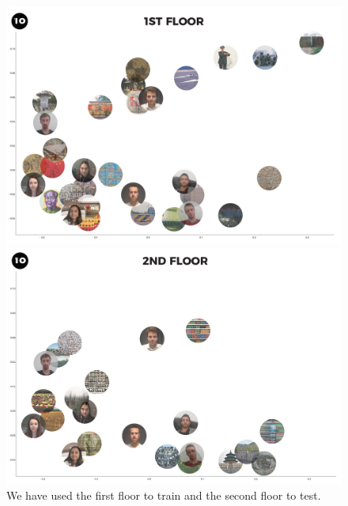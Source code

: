 \documentclass[journal, a4paper]{IEEEtran}
\begin{document}
\begin{figure}[!h]
  \centering
  \begin{minipage}[b]{0.24\textwidth}
    \includegraphics[width=\textwidth]{trainpca.png}
  \end{minipage}
  \hfill
  \begin{minipage}[b]{0.24\textwidth}
    \includegraphics[width=\textwidth]{testpca.png}
  \end{minipage}
  \caption{We have used the first floor to train and the second floor to test.}
  \label{fig:pca-art}
\end{figure}
\end{document}
